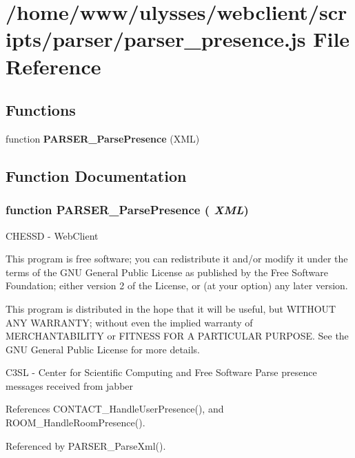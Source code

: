 \section{/home/www/ulysses/webclient/scripts/parser/parser\_\-presence.js File Reference}
\label{parser__presence_8js}
\subsection*{Functions}
\begin{CompactItemize}
\item 
function {\bf PARSER\_\-ParsePresence} (XML)
\end{CompactItemize}


\subsection{Function Documentation}
\subsubsection{\setlength{\rightskip}{0pt plus 5cm}function PARSER\_\-ParsePresence ( {\em XML})}\label{parser__presence_8js_a30203f0ae187eaddbcc60b04bc1a1ff}


CHESSD - WebClient

This program is free software; you can redistribute it and/or modify it under the terms of the GNU General Public License as published by the Free Software Foundation; either version 2 of the License, or (at your option) any later version.

This program is distributed in the hope that it will be useful, but WITHOUT ANY WARRANTY; without even the implied warranty of MERCHANTABILITY or FITNESS FOR A PARTICULAR PURPOSE. See the GNU General Public License for more details.

C3SL - Center for Scientific Computing and Free Software Parse presence messages received from jabber 

References CONTACT\_\-HandleUserPresence(), and ROOM\_\-HandleRoomPresence().

Referenced by PARSER\_\-ParseXml().